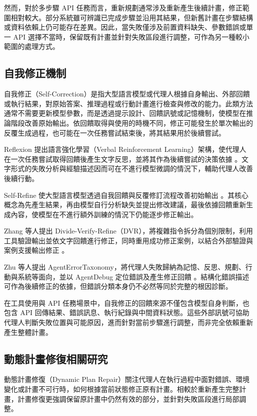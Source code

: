然而，對於多步驟 API 任務而言，重新規劃通常涉及重新產生後續計畫，修正範圍相對較大。部分系統雖可辨識已完成步驟並沿用其結果，但新舊計畫在步驟結構或資料依賴上仍可能存在差異。因此，當失敗僅涉及前置資料缺失、參數錯誤或單一 API 選擇不當時，保留既有計畫並針對失敗區段進行調整，可作為另一種較小範圍的處理方式。

\subsection{自我修正機制}

自我修正（Self-Correction）是指大型語言模型或代理人根據自身輸出、外部回饋或執行結果，對原始答案、推理過程或行動計畫進行檢查與修改的能力。此類方法通常不需要更新模型參數，而是透過提示設計、回饋訊號或記憶機制，使模型在推論階段改善原始輸出。依回饋取得與使用的時機不同，修正可能發生於單次輸出的反覆生成過程，也可能在一次任務嘗試結束後，將其結果用於後續嘗試。

Reflexion 提出語言強化學習（Verbal Reinforcement Learning）架構，使代理人在一次任務嘗試取得回饋後產生文字反思，並將其作為後續嘗試的決策依據 \cite{shinn2023reflexion}。文字形式的失敗分析與經驗描述因而可在不進行模型微調的情況下，輔助代理人改善後續行動。

Self-Refine 使大型語言模型透過自我回饋與反覆修訂流程改善初始輸出 \cite{madaan2023selfrefine}。其核心概念為先產生結果，再由模型自行分析缺失並提出修改建議，最後依據回饋重新生成內容，使模型在不進行額外訓練的情況下仍能逐步修正輸出。

Zhang 等人提出 Divide-Verify-Refine（DVR），將複雜指令拆分為個別限制，利用工具驗證輸出並依文字回饋進行修正，同時重用成功修正案例，以結合外部驗證與案例支援輸出修正 \cite{zhang2025dvr}。

Zhu 等人提出 AgentErrorTaxonomy，將代理人失敗歸納為記憶、反思、規劃、行動與系統等面向，並以 AgentDebug 定位錯誤及產生修正回饋 \cite{zhu2025agentdebug}。結構化錯誤描述可作為後續修正的依據，但錯誤分類本身仍不必然等同於完整的根因診斷。

在工具使用與 API 任務場景中，自我修正的回饋來源不僅包含模型自身判斷，也包含 API 回傳結果、錯誤訊息、執行紀錄與中間資料狀態。這些外部訊號可協助代理人判斷失敗位置與可能原因，進而針對當前步驟進行調整，而非完全依賴重新產生整體計畫。

\subsection{動態計畫修復相關研究}

動態計畫修復（Dynamic Plan Repair）關注代理人在執行過程中面對錯誤、環境變化或計畫不可行時，如何根據當前狀態修正原有計畫。相較於重新產生完整計畫，計畫修復更強調保留原計畫中仍然有效的部分，並針對失敗區段進行局部調整。

